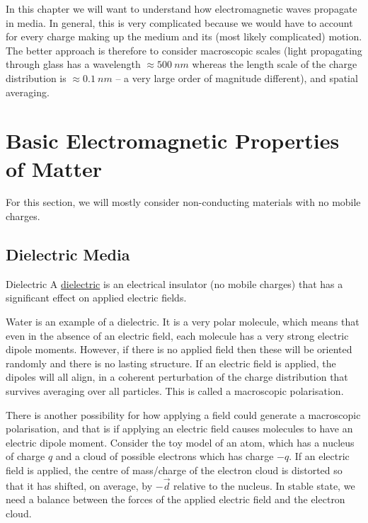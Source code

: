 \documentclass[../Main.tex]{subfiles}
\begin{document}
In this chapter we will want to understand how electromagnetic waves propagate in media. In general, this is very complicated because we would have to account for every charge making up the medium and its (most likely complicated) motion. The better approach is therefore to consider macroscopic scales (light propagating through glass has a wavelength $\approx 500~nm$ whereas the length scale of the charge distribution is $\approx 0.1~nm$ -- a very large order of magnitude different), and spatial averaging.
\section{Basic Electromagnetic Properties of Matter}
For this section, %
we will mostly consider non-conducting materials with no mobile charges.
\subsection{Dielectric Media}
\begin{definition}{Dielectric}
    A \underline{dielectric} is an electrical insulator (no mobile charges) that has a significant effect on applied electric fields.
\end{definition}
Water is an example of a dielectric. It is a very polar molecule, which means that even in the absence of an electric field, each molecule has a very strong electric dipole moments. However, if there is no applied field then these will be oriented randomly and there is no lasting structure. If an electric field is applied, the dipoles will all align, in a coherent perturbation of the charge distribution that survives averaging over all particles. This is called a macroscopic polarisation.

There is another possibility for how applying a field could generate a macroscopic polarisation, and that is if applying an electric field causes molecules to have an electric dipole moment. Consider the toy model of an atom, which has a nucleus of charge $q$ and a cloud of possible electrons which has charge $-q$. If an electric field is applied, the centre of mass/charge of the electron cloud is distorted so that it has shifted, on average, by $-\vec{d}$ relative to the nucleus. In stable state, we need a balance between the forces of the applied electric field and the electron cloud.
\end{document}
